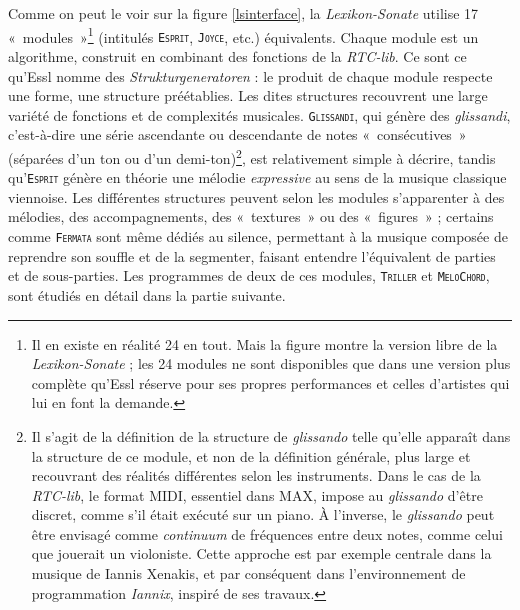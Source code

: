 \documentclass[a4paper,12pt]{article}
\newcommand{\guill}[1]{«~#1~»}
\newcommand{\module}[1]{\texttt{\textsc{#1}}}
\begin{document}
Comme on peut le voir sur la figure \ref{lsinterface}, la \emph{Lexikon-Sonate} utilise 17 \guill{modules}\footnote{Il en existe en réalité 24 en tout. Mais la figure montre la version libre de la \emph{Lexikon-Sonate} ; les 24 modules ne sont disponibles que dans une version plus complète qu'Essl réserve pour ses propres performances et celles d'artistes qui lui en font la demande.} (intitulés \module{Esprit}, \module{Joyce}, etc.) équivalents. Chaque module est un algorithme, construit en combinant des fonctions de la \emph{RTC-lib}. Ce sont ce qu'Essl nomme des \emph{Strukturgeneratoren} : le produit de chaque module respecte une forme, une structure préétablies. Les dites structures recouvrent une large variété de fonctions et de complexités musicales. \texttt{\textsc{Glissandi}}, qui génère des \emph{glissandi}, c'est-à-dire une série ascendante ou descendante de notes \guill{consécutives} (séparées d'un ton ou d'un demi-ton)\footnote{Il s'agit de la définition de la structure de \emph{glissando} telle qu'elle apparaît dans la structure de ce module, et non de la définition générale, plus large et recouvrant des réalités différentes selon les instruments. Dans le cas de la \emph{RTC-lib}, le format MIDI, essentiel dans MAX, impose au \emph{glissando} d'être discret, comme s'il était exécuté sur un piano. À l'inverse, le \emph{glissando} peut être envisagé comme \emph{continuum} de fréquences entre deux notes, comme celui que jouerait un violoniste. Cette approche est par exemple centrale dans la musique de Iannis Xenakis, et par conséquent dans l'environnement de programmation \emph{Iannix}, inspiré de ses travaux.}, est relativement simple à décrire, tandis qu'\texttt{\textsc{Esprit}} génère en théorie une mélodie \emph{expressive} au sens de la musique classique viennoise. Les différentes structures peuvent selon les modules s'apparenter à des mélodies, des accompagnements, des \guill{textures} ou des \guill{figures} ; certains comme \texttt{\textsc{Fermata}} sont même dédiés au silence, permettant à la musique composée de reprendre son souffle et de la segmenter, faisant entendre l'équivalent de parties et de sous-parties. Les programmes de deux de ces modules, \module{Triller} et \module{MeloChord}, sont étudiés en détail dans la partie suivante.
\end{document}
